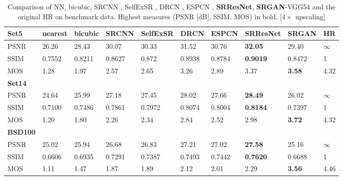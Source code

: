 \documentclass[10pt,twocolumn,letterpaper]{article}
\begin{document}
\begin{table}[htb!]
\centering
\caption{Comparison of NN, bicubic, SRCNN \cite{dong2014learning}, SelfExSR \cite{Huang15selfexemplars}, DRCN \cite{kim2016deeply}, ESPCN \cite{Shi2016ESPCN}, \textbf{SRResNet}, \textbf{SRGAN}-VGG54 and the original HR on benchmark data. Highest measures (PSNR [dB], SSIM, MOS) in bold. [$4\times$ upscaling]}
\label{tab:performance}
\begin{adjustbox}{max width=0.8\textwidth}
\begin{tabular}{llllllllll}
\textbf{Set5} & nearest & bicubic & SRCNN & SelfExSR & DRCN & ESPCN & \textbf{SRResNet} & \textbf{SRGAN} & HR \\
\hline
PSNR & 26.26 & 28.43 & 30.07 & 30.33 & 31.52 & 30.76 & \textbf{32.05} & 29.40 & $\infty$ \\
SSIM & 0.7552 & 0.8211 & 0.8627 & 0.872 & 0.8938 & 0.8784 & \textbf{0.9019} & 0.8472 & 1 \\
MOS  & 1.28 & 1.97 & 2.57 & 2.65 & 3.26 & 2.89 & 3.37 & \textbf{3.58} & 4.32 \\ [0.3cm]

\textbf{Set14} & & & & & & & & \\
\hline
PSNR & 24.64 & 25.99 & 27.18 & 27.45 & 28.02 & 27.66 & \textbf{28.49} & 26.02 & $\infty$ \\
SSIM & 0.7100 & 0.7486 & 0.7861 & 0.7972 & 0.8074 & 0.8004 & \textbf{0.8184} & 0.7397 & 1 \\
MOS  & 1.20 & 1.80 & 2.26 & 2.34 & 2.84 & 2.52 & 2.98 & \textbf{3.72} & 4.32 \\ [0.3cm]
\textbf{BSD100} & & & & & & & &  \\
\hline
PSNR & 25.02 & 25.94 & 26.68 & 26.83 & 27.21 & 27.02 & \textbf{27.58} & 25.16 & $\infty$ \\
SSIM & 0.6606 & 0.6935 & 0.7291 & 0.7387 & 0.7493 & 0.7442 & \textbf{0.7620} & 0.6688 & 1 \\
MOS  & 1.11 & 1.47 & 1.87 & 1.89 & 2.12 & 2.01 & 2.29 & \textbf{3.56} & 4.46 \\
\end{tabular}
\end{adjustbox}
\end{table}
\end{document}

